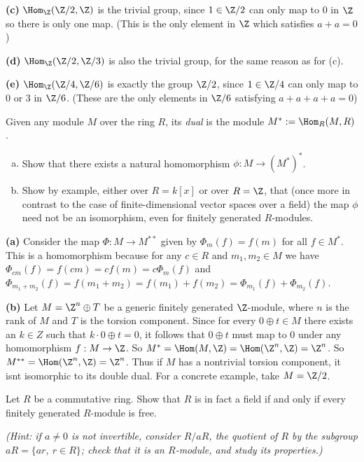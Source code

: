 \documentclass[11pt,letterpaper]{article}
\begin{document}
\textbf{(c)} $\Hom_\Z(\Z/2,\Z)$ is the trivial group, since $1\in \Z/2$ can only map to $0$ in $\Z$ so there is only one map. (This is the only element in $\Z$ which satisfies $a+a=0$)

\textbf{(d)} $\Hom_\Z(\Z/2,\Z/3)$ is also the trivial group, for the same reason as for (c). 

\textbf{(e)} $\Hom_\Z(\Z/4,\Z/6)$ is exactly the group $\Z/2$, since $1\in \Z/4$ can only map to $0$ or $3$ in $\Z/6$. (These are the only elements in $\Z/6$ satisfying $a+a+a+a=0$)

\pagebreak
\begin{problem}
  Given any module $M$ over the ring $R$, its \emph{dual} is the module $M^* := \Hom_R(M,R)$. 
  
  \begin{enumerate}[(a)]
    \item Show that there exists a natural homomorphism $\phi : M \to (M^*)^*$.
    \item Show by example, either  over $R = k[x]$ or over $R = \Z$, that (once more in contrast to the case of finite-dimensional vector spaces over a field) the map $\phi$ need not be an isomorphism, even for finitely generated $R$-modules.
  \end{enumerate}
\end{problem}

\textbf{(a)} Consider the map $\Phi : M \to M^{**}$ given by $\Phi_m(f) = f(m)$ for all $f\in M^*$. This is a homomorphism because for any $c\in R$ and $m_1, m_2\in M$ we have $\Phi_{cm}(f)=f(cm)=cf(m)=c\Phi_{m}(f)$ and $\Phi_{m_1+m_2}(f)=f(m_1+m_2)=f(m_1)+f(m_2)=\Phi_{m_1}(f)+\Phi_{m_2}(f)$.

\textbf{(b)} Let $M=\Z^n\oplus T$ be a generic finitely generated $\Z$-module, where $n$ is the rank of $M$ and $T$ is the torsion component. Since for every $0\oplus t \in M$ there exists an $k\in Z$ such that $k\cdot 0\oplus t = 0$, it follows that $0\oplus t$ must map to $0$ under any homomorphism $f : M \to \Z$. So $M^*=\Hom(M, \Z)=\Hom(\Z^n, \Z)=\Z^n$. So $M^{**}=\Hom(\Z^n, \Z) = \Z^n$. Thus if $M$ has a nontrivial torsion component, it isnt isomorphic to its double dual. For a concrete example, take $M=\Z/2$.           

\pagebreak
\begin{problem}
  Let $R$ be a commutative ring. Show that $R$ is in fact a field if and only if every finitely generated $R$-module is free. 
\end{problem}
\textit{(Hint: if $a\neq 0$ is not invertible, consider $R/aR$, the quotient of $R$ by the subgroup $aR=\{ar,\ r\in R\}$; check that it is an $R$-module, and study its properties.)}
\end{document}
